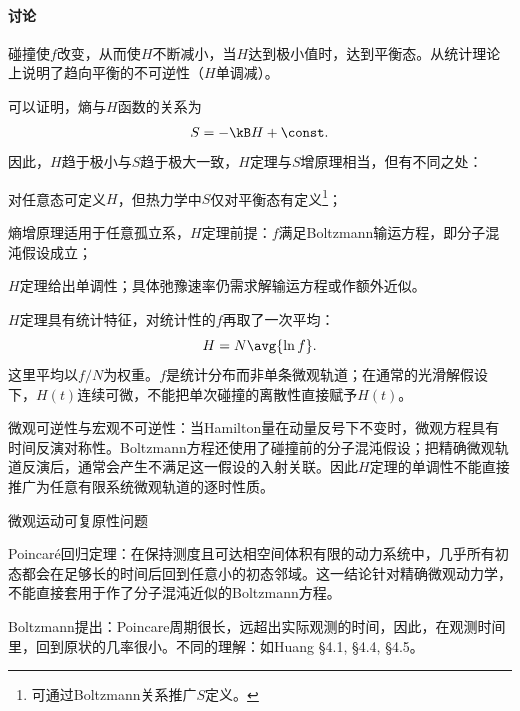 \paragraph{讨论}
\begin{compactenum}
	\item 碰撞使$f$改变，从而使$H$不断减小，当$H$达到极小值时，达到平衡态。从统计理论上说明了趋向平衡的不可逆性（$H$单调减）。
	\item 可以证明，熵与$H$函数的关系为
	\begin{align}
		S=-\kB H+\const.
	\end{align}
	因此，$H$趋于极小与$S$趋于极大一致，$H$定理与$S$增原理相当，但有不同之处：
	\begin{compactitem}
		\item 对任意态可定义$H$，但热力学中$S$仅对平衡态有定义\footnote{可通过Boltzmann关系推广$S$定义。}；
		\item 熵增原理适用于任意孤立系，$H$定理前提：$f$满足Boltzmann输运方程，即分子混沌假设成立；
		\item $H$定理给出单调性；具体弛豫速率仍需求解输运方程或作额外近似。
	\end{compactitem}
	\item $H$定理具有统计特征，对统计性的$f$再取了一次平均：
	\[
		H=N\avg{\ln f}.
	\]
	这里平均以$f/N$为权重。$f$是统计分布而非单条微观轨道；在通常的光滑解假设下，$H(t)$连续可微，不能把单次碰撞的离散性直接赋予$H(t)$。
	\item 微观可逆性与宏观不可逆性：当Hamilton量在动量反号下不变时，微观方程具有时间反演对称性。Boltzmann方程还使用了碰撞前的分子混沌假设；把精确微观轨道反演后，通常会产生不满足这一假设的入射关联。因此$H$定理的单调性不能直接推广为任意有限系统微观轨道的逐时性质。
	\item 微观运动可复原性问题
	
	Poincaré回归定理：在保持测度且可达相空间体积有限的动力系统中，几乎所有初态都会在足够长的时间后回到任意小的初态邻域。这一结论针对精确微观动力学，不能直接套用于作了分子混沌近似的Boltzmann方程。

	Boltzmann提出：Poincare周期很长，远超出实际观测的时间，因此，在观测时间里，回到原状的几率很小。不同的理解：如Huang \S 4.1, \S 4.4, \S 4.5。
\end{compactenum}